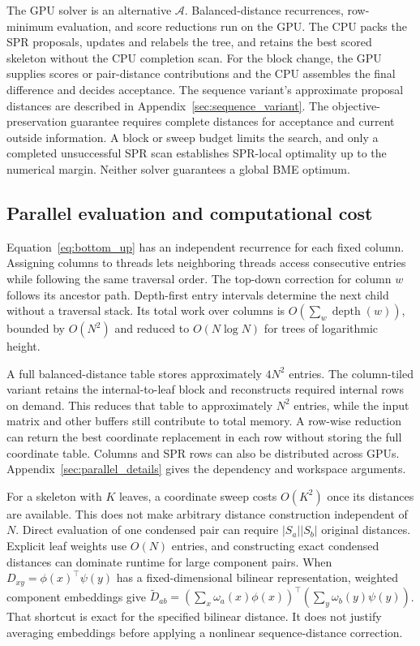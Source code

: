 \documentclass[11pt,a4paper]{article}
\makeatletter
\DeclareRobustCommand{\_}{\ifmmode\nfss@text{\textunderscore}\else\textunderscore\allowbreak\fi}
\theoremstyle{definition}
\makeatother
\begin{document}
The GPU solver is an alternative $\mathcal A$.
Balanced-distance recurrences, row-minimum evaluation, and score reductions run on the GPU.
The CPU packs the SPR proposals, updates and relabels the tree, and retains the best scored skeleton without the CPU completion scan.
For the block change, the GPU supplies scores or pair-distance contributions and the CPU assembles the final difference and decides acceptance.
The sequence variant's approximate proposal distances are described in Appendix~\ref{sec:sequence_variant}.
The objective-preservation guarantee requires complete distances for acceptance and current outside information.
A block or sweep budget limits the search, and only a completed unsuccessful SPR scan establishes SPR-local optimality up to the numerical margin.
Neither solver guarantees a global BME optimum.

\subsection{Parallel evaluation and computational cost}
\label{sec:parallel}

Equation~\eqref{eq:bottom_up} has an independent recurrence for each fixed column.
Assigning columns to threads lets neighboring threads access consecutive entries while following the same traversal order.
The top-down correction for column $w$ follows its ancestor path.
Depth-first entry intervals determine the next child without a traversal stack.
Its total work over columns is $O(\sum_w\operatorname{depth}(w))$, bounded by $O(N^2)$ and reduced to $O(N\log N)$ for trees of logarithmic height.

A full balanced-distance table stores approximately $4N^2$ entries.
The column-tiled variant retains the internal-to-leaf block and reconstructs required internal rows on demand.
This reduces that table to approximately $N^2$ entries, while the input matrix and other buffers still contribute to total memory.
A row-wise reduction can return the best coordinate replacement in each row without storing the full coordinate table.
Columns and SPR rows can also be distributed across GPUs.
Appendix~\ref{sec:parallel_details} gives the dependency and workspace arguments.

For a skeleton with $K$ leaves, a coordinate sweep costs $O(K^2)$ once its distances are available.
This does not make arbitrary distance construction independent of $N$.
Direct evaluation of one condensed pair can require $|S_a||S_b|$ original distances.
Explicit leaf weights use $O(N)$ entries, and constructing exact condensed distances can dominate runtime for large component pairs.
When $D_{xy}=\phi(x)^\top\psi(y)$ has a fixed-dimensional bilinear representation, weighted component embeddings give
$\widetilde D_{ab}=(\sum_x\omega_a(x)\phi(x))^\top
(\sum_y\omega_b(y)\psi(y))$.
That shortcut is exact for the specified bilinear distance.
It does not justify averaging embeddings before applying a nonlinear sequence-distance correction.
\end{document}
